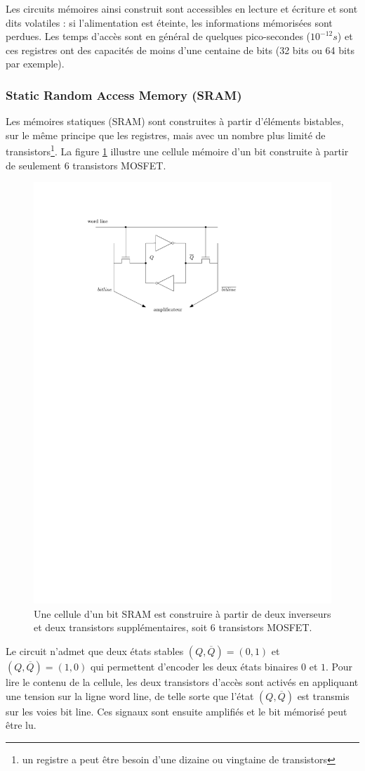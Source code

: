 Les circuits mémoires ainsi construit sont accessibles en lecture et écriture et sont dits volatiles : si l'alimentation est éteinte, les informations mémorisées sont perdues. Les temps d'accès sont en général de quelques pico-secondes ($10^{-12}s$) et ces registres ont des capacités de moins d'une centaine de bits (32 bits ou 64 bits par exemple).

\subsubsection{Static Random Access Memory (SRAM)}

Les mémoires statiques (SRAM) sont construites à partir d'éléments bistables, sur le même principe que les registres, mais avec un nombre plus limité de transistors\footnote{un registre a peut être besoin d'une dizaine ou vingtaine de transistors}. La figure \ref{fig:mem_sram} illustre une cellule mémoire d'un bit construite à partir de seulement 6 transistors MOSFET.

\begin{figure}[htbp]
\centering\includegraphics[width=0.5\linewidth]{Figs/sram_inner.pdf}
\caption{\label{fig:mem_sram} Une cellule d'un bit SRAM est construire à partir de deux inverseurs et deux transistors supplémentaires, soit 6 transistors MOSFET. }
\end{figure}

Le circuit n'admet que deux états stables $(Q, \overline{Q}) = (0,1)$ et $(Q, \overline{Q}) = (1, 0)$ qui permettent d'encoder les deux états binaires $0$ et $1$. Pour lire le contenu de la cellule, les deux transistors d'accès sont activés en appliquant une tension sur la ligne word line, de telle sorte que l'état $(Q, \overline{Q})$ est transmis sur les voies bit line. Ces signaux sont ensuite amplifiés et le bit mémorisé peut être lu.

